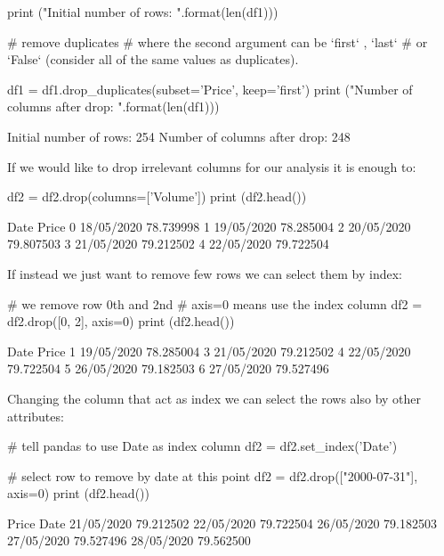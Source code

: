 \begin{ipython}
print ("Initial number of rows: {}".format(len(df1)))

# remove duplicates
# where the second argument can be `first` , `last`
# or `False` (consider all of the same values as duplicates).

df1 = df1.drop_duplicates(subset='Price', keep='first')
print ("Number of columns after drop: {}".format(len(df1)))
\end{ipython}
\begin{ioutput}
Initial number of rows: 254
Number of columns after drop: 248
\end{ioutput}

If we would like to drop irrelevant columns for our analysis it is enough to:

\begin{ipython}
df2 = df2.drop(columns=['Volume'])
print (df2.head())
\end{ipython}
\begin{ioutput}
         Date      Price
0  18/05/2020  78.739998
1  19/05/2020  78.285004
2  20/05/2020  79.807503
3  21/05/2020  79.212502
4  22/05/2020  79.722504
\end{ioutput}
        
If instead we just want to remove few rows we can select them by index:

\begin{ipython}
# we remove row 0th and 2nd
# axis=0 means use the index column
df2 = df2.drop([0, 2], axis=0)
print (df2.head())
\end{ipython}
\begin{ioutput}
         Date      Price
1  19/05/2020  78.285004
3  21/05/2020  79.212502
4  22/05/2020  79.722504
5  26/05/2020  79.182503
6  27/05/2020  79.527496
\end{ioutput}
        
Changing the column that act as index we can select the rows also by other attributes:

\begin{ipython}
# tell pandas to use Date as index column
df2 = df2.set_index('Date')

# select row to remove by date at this point
df2 = df2.drop(["2000-07-31"], axis=0)
print (df2.head())
\end{ipython}
\begin{ioutput}
                Price
Date                 
21/05/2020  79.212502
22/05/2020  79.722504
26/05/2020  79.182503
27/05/2020  79.527496
28/05/2020  79.562500
\end{ioutput}
        
